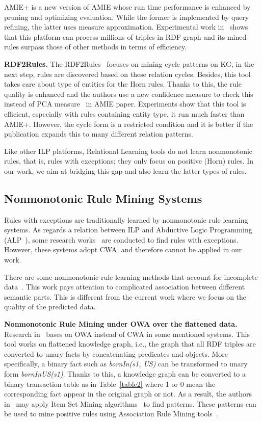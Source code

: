AMIE+ is a new version of AMIE whose run time performance is enhanced by pruning and optimizing evaluation. While the former is implemented by query refining, the latter uses measure approximation. Experimental work in~\cite{ref10} shows that this platform can process millions of triples in RDF graph and its mined rules surpass those of other methods in terms of efficiency.

\textbf{RDF2Rules.} The RDF2Rules~\cite{ref29} focuses on mining cycle patterns on KG, in the next step, rules are discovered based on these relation cycles. Besides, this tool takes care about type of entities for the Horn rules. Thanks to this, the rule quality is enhanced and the authors use a new confidence measure to check this instead of PCA measure~\cite{ref10} in AMIE paper. Experiments show that this tool is efficient, especially with rules containing entity type, it run much faster than AMIE+. However, the cycle form is a restricted condition and it is better if the publication expands this to many different relation patterns.

Like other ILP platforms, Relational Learning tools do not learn nonmonotonic rules, that is, rules with exceptions; they only focus on positive (Horn) rules. In our work, we aim at bridging this gap and also learn the latter types of rules.

\subsection{Nonmonotonic Rule Mining Systems}
\label{related-work-nonmonotonic-rule-mining-systems}

Rules with exceptions are traditionally learned by nonmonotonic rule learning systems. As regards a relation between ILP and Abductive Logic Programming (ALP~\cite{ref31}), some research works~\cite{ref11, ref32, ref33} are conducted to find rules with exceptions. However, these systems adopt CWA, and therefore cannot be applied in our work.

There are some nonmonotonic rule learning methods that account for incomplete data~\cite{ref34}. This work pays attention to complicated association between different semantic parts. This is different from the current work where we focus on the quality of the predicted data.

\textbf{Nonmonotonic Rule Mining under OWA over the flattened data.} Research in~\cite{ref12} bases on OWA instead of CWA in some mentioned systems. This tool works on flattened knowledge graph, i.e., the graph that all RDF triples are converted to unary facts by concatenating predicates and objects. More specifically, a binary fact such as \textit{bornIn(s1, US)} can be transformed to unary form \textit{bornInUS(s1)}. Thanks to this, a knowledge graph can be converted to a binary transaction table as in Table~\ref{table2} where 1 or 0 mean the corresponding fact appear in the original graph or not. As a result, the authors in~\cite{ref12} may apply Item Set Mining algorithms~\cite{ref37} to find patterns. These patterns can be used to mine positive rules using Association Rule Mining tools~\cite{ref13}.

